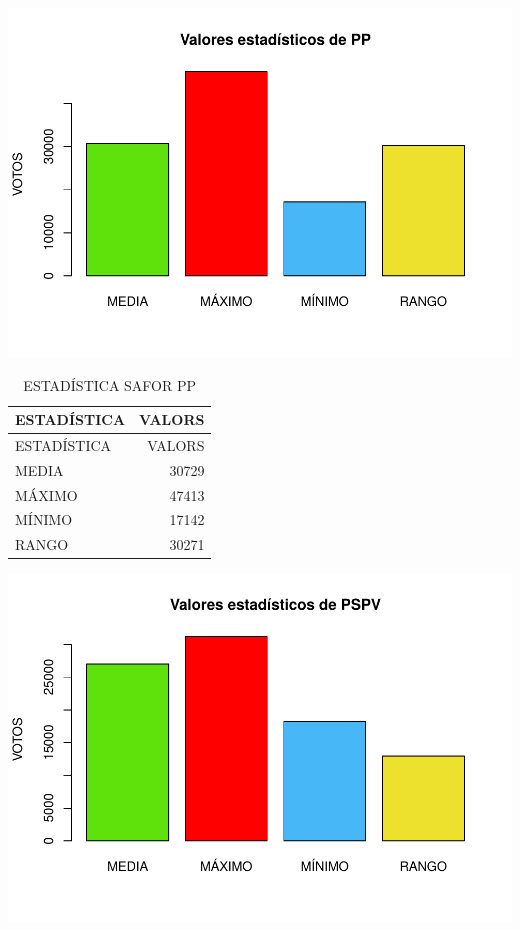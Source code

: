 \documentclass[
]{article}
\begin{document}
\includegraphics{SAFOR_files/figure-latex/6-1.pdf}

\begin{longtable}[]{@{}lr@{}}
\caption{ESTADÍSTICA SAFOR PP}\tabularnewline
\toprule\noalign{}
ESTADÍSTICA & VALORS \\
\midrule\noalign{}
\endfirsthead
\toprule\noalign{}
ESTADÍSTICA & VALORS \\
\midrule\noalign{}
\endhead
\bottomrule\noalign{}
\endlastfoot
MEDIA & 30729 \\
MÁXIMO & 47413 \\
MÍNIMO & 17142 \\
RANGO & 30271 \\
\end{longtable}

\includegraphics{SAFOR_files/figure-latex/6-2.pdf}
\end{document}
